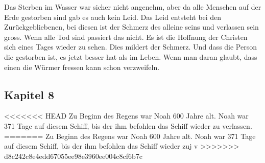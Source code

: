 Das Sterben im Wasser war sicher nicht angenehm, aber da alle Menschen auf der Erde gestorben sind gab es auch kein Leid. Das Leid entsteht bei den Zurückgebliebenen, bei diesen ist der Schmerz des alleine seins und verlassen sein gross. Wenn alle Tod sind passiert das nicht. Es ist die Hoffnung der Christen sich eines Tages wieder zu sehen. Dies mildert der Schmerz. Und dass die Person die gestorben ist, es jetzt besser hat als im Leben. Wenn man daran glaubt, dass einen die Würmer fressen kann schon verzweifeln.
\subsection{Kapitel 8}
<<<<<<< HEAD
Zu Beginn des Regens war Noah 600 Jahre alt. Noah war 371 Tage auf diesem Schiff, bis der \herr{} ihm befohlen das Schiff wieder zu verlassen.
=======
Zu Beginn des Regens war Noah 600 Jahre alt. Noah war 371 Tage auf diesem Schiff, bis der \herr ihm befohlen das Schiff wieder zuj v
>>>>>>> d8c242c8e4edd67055ee98e3960ee004c8cf6b7c
